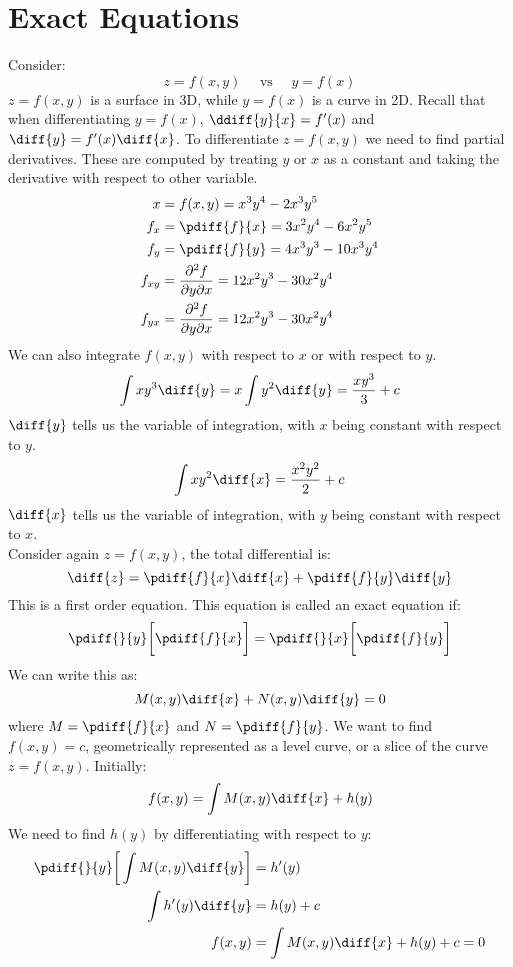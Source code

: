 \documentclass{math}
\begin{document}
\section*{Exact Equations}
Consider:
\[ z = f(x,y) \quad \text{ vs } \quad y = f(x) \]
\( z = f(x,y) \) is a surface in 3D, while \( y = f(x) \) is a curve in 2D.
Recall that when differentiating \( y = f(x) \), \( \ddiff{y}{x} = f'(x) \)
and \( \diff{y} = f'(x)\diff{x} \). To differentiate \( z = f(x,y) \) we need
to find partial derivatives. These are computed by treating \( y \) or \( x \)
as a constant and taking the derivative with respect to other variable.
\begin{align*}
  x &= f(x,y) = x^3y^4-2x^3y^5 \\
  f_x &= \pdiff{f}{x} = 3x^2y^4-6x^2y^5 \\
  f_y &= \pdiff{f}{y} = 4x^3y^3-10x^3y^4 \\
  f_{xy} &= \frac{\partial^2f}{\partial{y}\partial{x}} = 12x^2y^3-30x^2y^4 \\
  f_{yx} &= \frac{\partial^2f}{\partial{y}\partial{x}} = 12x^2y^3-30x^2y^4 \\
\end{align*}
We can also integrate \( f(x,y) \) with respect to \( x \) or with respect to
\( y \).
\[ \int xy^3\diff{y} = x\int y^2\diff{y} = \frac{xy^3}{3}+c \]
\( \diff{y} \) tells us the variable of integration, with \( x \) being constant
with respect to \( y \).
\[ \int xy^2\diff{x} = \frac{x^2y^2}{2}+c \]
\( \diff{x} \) tells us the variable of integration, with \( y \) being constant
with respect to \( x \). \\
Consider again \( z = f(x,y) \), the total differential is:
\[ \diff{z} = \pdiff{f}{x}\diff{x}+\pdiff{f}{y}\diff{y} \]
This is a first order equation. This equation is called an exact equation if:
\[ \pdiff{}{y}\bigg[\pdiff{f}{x}\bigg] = \pdiff{}{x}\bigg[\pdiff{f}{y}\bigg] \]
We can write this as:
\[ M(x,y)\diff{x}+N(x,y)\diff{y} = 0 \]
where \( M = \pdiff{f}{x} \) and \( N = \pdiff{f}{y} \). We want to find
\( f(x,y) = c \), geometrically represented as a level curve, or a slice of the
curve \( z = f(x,y) \). Initially:
\[ f(x,y) = \int M(x,y)\diff{x}+h(y) \]
We need to find \( h(y) \) by differentiating with respect to \( y \):
\begin{align*}
  \pdiff{}{y}\bigg[\int M(x,y)\diff{y}\bigg] &= h'(y) \\
  \int h'(y)\diff{y} &= h(y)+c \\
  f(x,y) &= \int M(x,y)\diff{x}+h(y)+c = 0
\end{align*}
\end{document}
